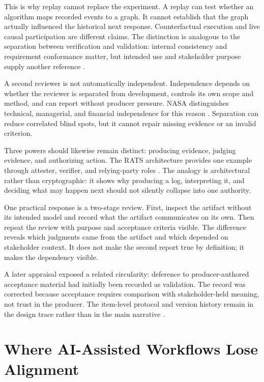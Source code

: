 \documentclass[10pt,a4paper]{article}
\begin{document}
This is why replay cannot replace the experiment. A replay can test whether an algorithm maps recorded events to a graph. It cannot establish that the graph actually influenced the historical next response. Counterfactual execution and live causal participation are different claims. The distinction is analogous to the separation between verification and validation: internal consistency and requirement conformance matter, but intended use and stakeholder purpose supply another reference \cite{nasaivv,ieee1012}.

A second reviewer is not automatically independent. Independence depends on whether the reviewer is separated from development, controls its own scope and method, and can report without producer pressure. NASA distinguishes technical, managerial, and financial independence for this reason \cite{nasa8739}. Separation can reduce correlated blind spots, but it cannot repair missing evidence or an invalid criterion.

Three powers should likewise remain distinct: producing evidence, judging evidence, and authorizing action. The RATS architecture provides one example through attester, verifier, and relying-party roles \cite{rfc9334}. The analogy is architectural rather than cryptographic: it shows why producing a log, interpreting it, and deciding what may happen next should not silently collapse into one authority.

One practical response is a two-stage review. First, inspect the artifact without its intended model and record what the artifact communicates on its own. Then repeat the review with purpose and acceptance criteria visible. The difference reveals which judgments came from the artifact and which depended on stakeholder context. It does not make the second report true by definition; it makes the dependency visible.

A later appraisal exposed a related circularity: deference to producer-authored acceptance material had initially been recorded as validation. The record was corrected because acceptance requires comparison with stakeholder-held meaning, not trust in the producer. The item-level protocol and version history remain in the design trace rather than in the main narrative \cite{sessionrecord,stakeholderledger}.

\section{Where AI-Assisted Workflows Lose Alignment}
\end{document}
